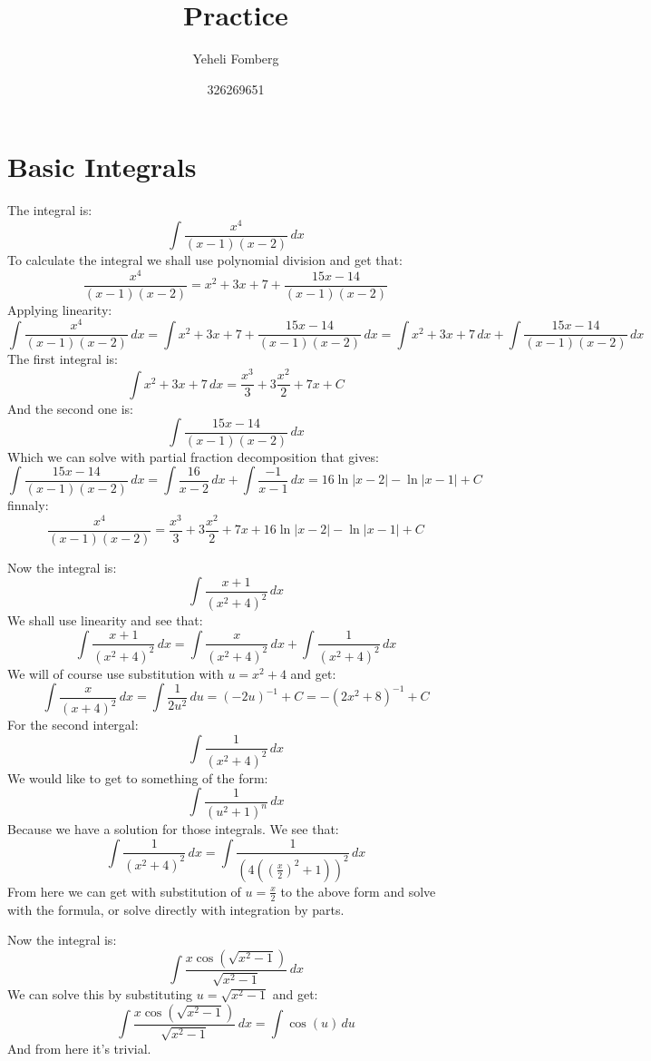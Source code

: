 \documentclass{article}
\title{\textbf{Practice}}
\author{Yeheli Fomberg}
\date{326269651}
\theoremstyle{plain}
\begin{document}
	\maketitle
	\newpage
	\section{Basic Integrals}\label{basicintegrals}
	The integral is:
	\[
		\int{\frac{x^4}{(x-1)(x-2)}\,dx}
	\]
	To calculate the integral we shall use polynomial division and get that:
	\[
		\frac{x^4}{(x-1)(x-2)} = x^2+3x+7 + \frac{15x-14}{(x-1)(x-2)}
	\]
	Applying linearity:
	\[
		\int{\frac{x^4}{(x-1)(x-2)}\,dx} = 
		\int{x^2+3x+7 + \frac{15x-14}{(x-1)(x-2)}\,dx} = 
		\int{x^2+3x+7\,dx} + \int{\frac{15x-14}{(x-1)(x-2)}\,dx}
	\]
	The first integral is:
	\[
		\int{x^2+3x+7\,dx} = \frac{x^3}{3} + 3\frac{x^2}{2} + 7x + C
	\]
	And the second one is:
	\[
		\int{\frac{15x-14}{(x-1)(x-2)}\,dx}
	\]
	Which we can solve with partial fraction decomposition that gives:
	\[
		\int{\frac{15x-14}{(x-1)(x-2)}\,dx} = 
		\int{\frac{16}{x-2}\,dx} + \int{\frac{-1}{x-1}\,dx} = 
		16\ln|x-2| - \ln|x-1| + C
	\]
	finnaly:
	\[
		\frac{x^4}{(x-1)(x-2)} = \frac{x^3}{3} + 3\frac{x^2}{2} + 7x + 
		16\ln|x-2| - \ln|x-1| + C
	\]
	
	\newpage
	
	Now the integral is:
	\[
		\int{\frac{x+1}{(x^2+4)^2}\,dx}
	\]
	We shall use linearity and see that:
	\[
		\int{\frac{x+1}{(x^2+4)^2}\,dx} = 
		\int{\frac{x}{(x^2+4)^2}\,dx} + 
		\int{\frac{1}{(x^2+4)^2}\,dx}
	\]
	We will of course use substitution with $u=x^2+4$ and get:
	\[
		\int{\frac{x}{(x+4)^2}\,dx} = 
		\int{\frac{1}{2u^2}\,du} = 
		(-2u)^{-1} + C = 
		-(2x^2+8)^{-1} + C
	\]
	For the second intergal:
	\[
		\int{\frac{1}{(x^2+4)^2}\,dx}
	\]
	We would like to get to something of the form:
	\[
		\int{\frac{1}{(u^2+1)^n}\,dx}
	\]
	Because we have a solution for those integrals. We see that:
	\[
		\int{\frac{1}{(x^2+4)^2}\,dx} = 
		\int{\frac{1}{(4(\left(\frac{x}{2}\right)^2+1))^2}\,dx}
	\]
	From here we can get with substitution of $u = \frac{x}{2}$ to the above
	form and solve with the formula, or solve directly with integration by
	parts.
	
	\newpage
	
	Now the integral is:
	\[
		\int{\frac{x\cos(\sqrt{x^2-1})}{\sqrt{x^2-1}}\,dx}
	\]
	We can solve this by substituting $u = \sqrt{x^2-1}$ and get:
	\[
		\int{\frac{x\cos(\sqrt{x^2-1})}{\sqrt{x^2-1}}\,dx} = 
		\int{\cos(u)\,du}
	\]
	And from here it's trivial.
	
\end{document}

